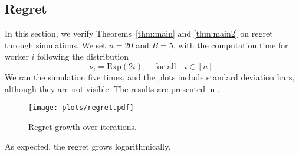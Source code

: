 \subsection{Regret}
\label{sec:regret}

In this section, we verify Theorems~\ref{thm:main} and \ref{thm:main2} on regret through simulations. We set $n = 20$ and $B = 5$, with the computation time for worker $i$ following the distribution
$$
\nu_i = \mathrm{Exp}(2i), \quad \text{for all} \quad i \in [n]~.
$$
We ran the simulation five times, and the plots include standard deviation bars, although they are not visible. The results are presented in .

\begin{figure}[h]
\centering
\texttt{[image: plots/regret.pdf]}
\caption{Regret growth over iterations.}
\label{fig:regret}
\end{figure}

As expected, the regret grows logarithmically.
